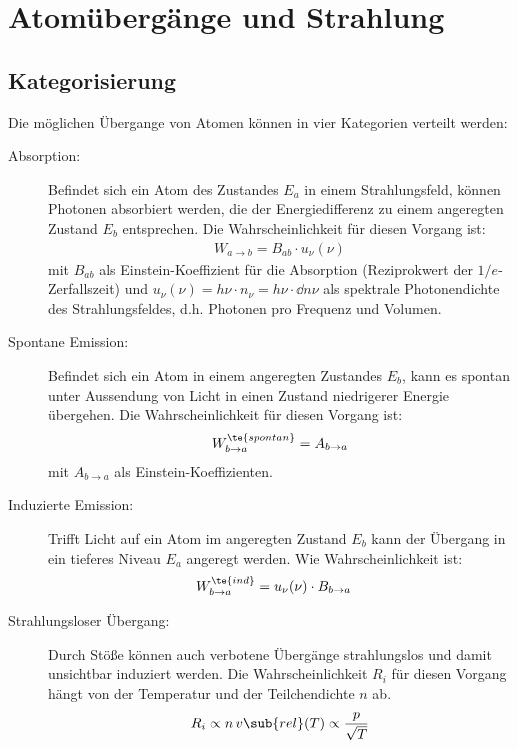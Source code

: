 \documentclass[twocolumn]{summery_4.1}
\begin{document}
\section{Atomübergänge und Strahlung}
\subsection{Kategorisierung}
Die möglichen Übergange von Atomen können in vier Kategorien verteilt werden:
\begin{description}
    \item[Absorption:] Befindet sich ein Atom des Zustandes $E_a$ in einem Strahlungsfeld, können Photonen absorbiert
    werden, die der Energiedifferenz zu einem angeregten Zustand $E_b$ entsprechen. Die Wahrscheinlichkeit für diesen Vorgang ist:
    \begin{align*}
        W_{a\to b} = B_{ab}\cdot u_\nu (\nu)
    \end{align*}
    mit \(B_{ab}\) als Einstein-Koeffizient für die Absorption (Reziprokwert der $1/e$-Zerfallszeit) und \(u_\nu(\nu)=h\nu\cdot n_\nu= h\nu \cdot \dd n\nu \) als spektrale Photonendichte des Strahlungsfeldes, d.h. Photonen pro Frequenz und Volumen. 
    \item[Spontane Emission:] Befindet sich ein Atom in einem angeregten Zustandes $E_b$, kann es spontan unter Aussendung von Licht in einen Zustand niedrigerer Energie übergehen. Die Wahrscheinlichkeit für diesen Vorgang ist:
    \begin{align*}
        W_{b\to a}^{\te{spontan}} = A_{b\to a}    
    \end{align*} mit \(A_{b\to a}\) als Einstein-Koeffizienten.
    \item[Induzierte Emission:] Trifft Licht auf ein Atom im angeregten Zustand $E_b$ kann der Übergang in ein tieferes Niveau $E_a$ angeregt werden. Wie Wahrscheinlichkeit ist:
    \begin{align*}
            W_{b\to a}^\te{ind} &= u_\nu (\nu) \cdot B_{b\to a}
    \end{align*}
    \item[Strahlungsloser Übergang:] Durch Stöße können auch verbotene Übergänge strahlungslos und damit unsichtbar induziert
    werden. Die Wahrscheinlichkeit \(R_i\) für diesen Vorgang hängt von der Temperatur und der Teilchendichte \(n\) ab.
    \begin{align*}
        R_i \propto n \,v\sub{rel}(T)\propto \frac{p}{\sqrt T}
    \end{align*}
\end{description}
\end{document}
